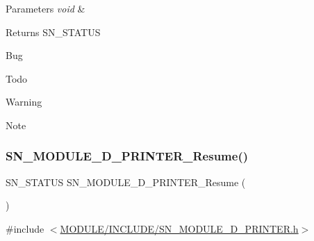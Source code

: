 \begin{DoxyParams}{Parameters}
{\em void} & \\
\hline
\end{DoxyParams}
\begin{DoxyReturn}{Returns}
S\+N\+\_\+\+S\+T\+A\+T\+US 
\end{DoxyReturn}
\begin{DoxyRefDesc}{Bug}
\item[\hyperlink{bug__bug000006}{Bug}]\end{DoxyRefDesc}
\begin{DoxyRefDesc}{Todo}
\item[\hyperlink{todo__todo000006}{Todo}]\end{DoxyRefDesc}
\begin{DoxyWarning}{Warning}

\end{DoxyWarning}
\begin{DoxyNote}{Note}

\end{DoxyNote}
\mbox{\label{group__PRINTER_gaabec8b5f01119d989d725eff26053ca5}} 
\subsubsection{\texorpdfstring{S\+N\+\_\+\+M\+O\+D\+U\+L\+E\+\_\+D\+\_\+\+P\+R\+I\+N\+T\+E\+R\+\_\+\+Resume()}{SN\_MODULE\_3D\_PRINTER\_Resume()}}
{\footnotesize\ttfamily S\+N\+\_\+\+S\+T\+A\+T\+US S\+N\+\_\+\+M\+O\+D\+U\+L\+E\+\_\+D\+\_\+\+P\+R\+I\+N\+T\+E\+R\+\_\+\+Resume (\begin{DoxyParamCaption}\item[{void}]{ }\end{DoxyParamCaption})}



{\ttfamily \#include $<$\hyperlink{SN__MODULE__3D__PRINTER_8h}{M\+O\+D\+U\+L\+E/\+I\+N\+C\+L\+U\+D\+E/\+S\+N\+\_\+\+M\+O\+D\+U\+L\+E\+\_\+D\+\_\+\+P\+R\+I\+N\+T\+E\+R.\+h}$>$}


